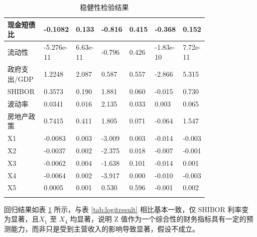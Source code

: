 \begin{longtable}{p{0.18\linewidth}p{0.1\linewidth}p{0.1\linewidth}p{0.1\linewidth}p{0.1\linewidth}p{0.12\linewidth}p{0.1\linewidth}}
	现金短债比        & -0.1082       & 0.133            & -0.816     & 0.415          & -0.368          & 0.152           \\ \hline
	流动性            & -5.276e-11    & 6.63e-11         & -0.796     & 0.426          & -1.83e-10       & 7.72e-11        \\ \hline
	政府支出/GDP      & 1.2248        & 2.087            & 0.587      & 0.557          & -2.866          & 5.315           \\ \hline
	SHIBOR            & 0.3573        & 0.190            & 1.881      & 0.060          & -0.015          & 0.730           \\ \hline
	波动率            & 0.0341        & 0.016            & 2.135      & 0.033          & 0.003           & 0.065           \\ \hline
	房地产政策        & 0.7415        & 0.411            & 1.805      & 0.071          & -0.064          & 1.547           \\ \hline
	X1                & -0.0083       & 0.003            & -3.009     & 0.003          & -0.014          & -0.003          \\ \hline
	X2                & -0.0037       & 0.002            & -2.375     & 0.018          & -0.007          & -0.001          \\ \hline
	X3                & -0.0062       & 0.004            & -1.638     & 0.101          & -0.014          & 0.001           \\ \hline
	X4                & -0.0064       & 0.002            & -3.917     & 0.000          & -0.010          & -0.003          \\ \hline
	X5                & 0.0005        & 0.001            & 0.530      & 0.596          & -0.001          & 0.002           \\ \hline
	\caption{稳健性检验结果}
	\label{tab:robust}
\end{longtable}

回归结果如表 \ref{tab:robust} 所示，与表 \ref{tab:logitresult} 相比基本一致，仅 SHIBOR 利率变为显著，且\(X_1\) 至 \(X_4\) 均显著，说明 Z 值作为一个综合性的财务指标具有一定的预测能力，而非只是受到主营收入的影响导致显著，假设不成立。
